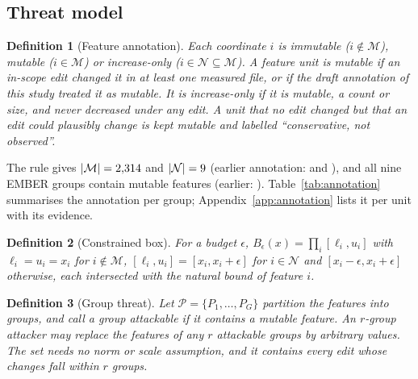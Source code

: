 \documentclass[preprint,12pt,authoryear]{elsarticle}
\newtheorem{definition}{Definition}
\begin{document}
\subsection{Threat model}\label{sec:tm}
\begin{definition}[Feature annotation]
Each coordinate $i$ is \emph{immutable} ($i\notin\mathcal{M}$), \emph{mutable} ($i\in\mathcal{M}$) or \emph{increase-only} ($i\in\mathcal{N}\subseteq\mathcal{M}$). A feature unit is mutable if an in-scope edit changed it in at least one measured file, or if the draft annotation of this study treated it as mutable. It is increase-only if it is mutable, a count or size, and never decreased under any edit. A unit that no edit changed but that an edit could plausibly change is kept mutable and labelled ``conservative, not observed''.
\end{definition}
The rule gives $|\mathcal{M}|=2{,}314$ and $|\mathcal{N}|=9$ (earlier annotation: \PsNMutableDraft{} and \PsNMonotoneDraft), and all nine EMBER groups contain mutable features (earlier: \PsNAttackableDraft). Table~\ref{tab:annotation} summarises the annotation per group; Appendix~\ref{app:annotation} lists it per unit with its evidence.

\begin{table}[!htbp]
\centering\small
\caption{Repaired feature annotation per EMBER group: mutable and increase-only features before (draft) and after the repair. Per-unit evidence in Appendix~\ref{app:annotation}.}\label{tab:annotation}
\resizebox{\textwidth}{!}{}
\end{table}

\begin{definition}[Constrained box]
For a budget $\epsilon$, $B_\epsilon(x)=\prod_i[\ell_i,u_i]$ with $\ell_i=u_i=x_i$ for $i\notin\mathcal{M}$, $[\ell_i,u_i]=[x_i,x_i+\epsilon]$ for $i\in\mathcal{N}$ and $[x_i-\epsilon,x_i+\epsilon]$ otherwise, each intersected with the natural bound of feature $i$.
\end{definition}

\begin{definition}[Group threat]
Let $\mathcal{P}=\{P_1,\dots,P_G\}$ partition the features into groups, and call a group \emph{attackable} if it contains a mutable feature. An $r$-group attacker may replace the features of any $r$ attackable groups by arbitrary values. The set needs no norm or scale assumption, and it contains every edit whose changes fall within $r$ groups.
\end{definition}
\end{document}
